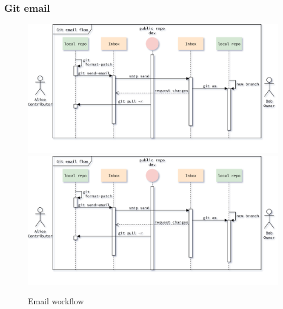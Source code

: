 \begin{frame}
    \frametitle{Git email}
    \begin{figure}
        \begin{center}
            {
                \includegraphics[height=0.7\textheight,keepaspectratio]{./images/EmailWorkflow_UpdateLocalRepository.png}
            }
            {
                \includegraphics[height=0.75\textheight,keepaspectratio]{./images/EmailWorkflow_UpdateLocalRepository.png}
            }
            \caption{Email workflow}
        \end{center}
    \end{figure}
\end{frame}

